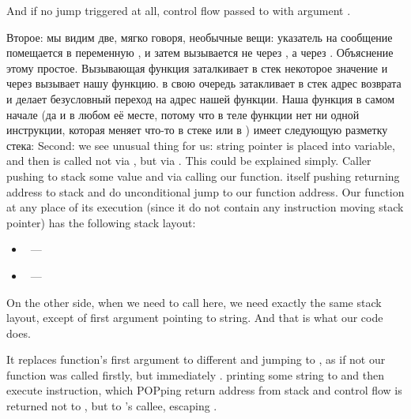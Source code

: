{And if no jump triggered at all, control flow passed to \printf with argument .}

\label{jump_to_last_printf}
\IFRU
{Второе: мы видим две, мягко говоря, необычные вещи: указатель на сообщение помещается в переменную , 
и затем \printf вызывается не через \CALL, а через \JMP. Объяснение этому простое. 
Вызывающая функция заталкивает в стек некоторое значение и через \CALL вызывает нашу функцию. 
\CALL в свою очередь затакливает в стек адрес возврата и делает безусловный переход на адрес нашей функции. 
Наша функция в самом начале (да и в любом её месте, потому что в теле функции нет ни одной инструкции, 
которая меняет что-то в стеке или в \ESP) имеет следующую разметку стека:}
{Second: we see unusual thing for us: string pointer is placed into  variable, and 
then \printf is called not via \CALL, but via \JMP. This could be explained simply. 
Caller pushing to stack some value and via \CALL calling our function. 
\CALL itself pushing returning address to stack and do unconditional jump to our function address. 
Our function at any place of its execution (since it do not contain any instruction moving stack 
pointer) has the following stack layout:}

\begin{itemize}
\item\ESP ~---  
\item{} ~---  
\end{itemize}

{On the other side, when we need to call \printf here, we need exactly the same stack 
layout, except of first \printf argument pointing to string. 
And that is what our code does.}

{It replaces function's first argument to different and 
jumping to \printf, as if not our function  was called firstly, but immediately \printf.
\printf printing some string to  and then execute \RET instruction, which POPping 
return address from stack and control flow is returned not to , but to 's callee, 
escaping .}

